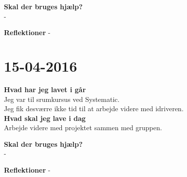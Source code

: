 \documentclass{article}
\begin{document}
	\textbf{Skal der bruges hjælp?}\\
	-
	
	\textbf{Reflektioner}
	-
	
	
	
	\section{15-04-2016}
	
	\textbf{Hvad har jeg lavet i går}\\
	Jeg var til srumkursus ved Systematic.\\
	Jeg fik desværre ikke tid til at arbejde videre med idriveren.\\
	
	\textbf{Hvad skal jeg lave i dag}\\
	Arbejde videre med projektet sammen med gruppen. 
	
	\textbf{Skal der bruges hjælp?}\\
	-
	
	\textbf{Reflektioner}
	-
	
\end{document}
